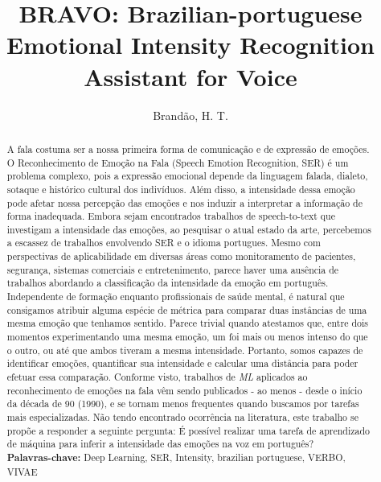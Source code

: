 \documentclass[12pt]{report}
\title{BRAVO: Brazilian-portuguese Emotional Intensity Recognition Assistant for Voice}
\author{Brandão, H. T.}
\begin{document}
\maketitle

\begin{abstract}
A fala costuma ser a nossa primeira forma de comunicação e de expressão de emoções. O Reconhecimento de Emoção na Fala (Speech Emotion Recognition, SER) é um problema complexo, pois a expressão emocional depende da linguagem falada, dialeto, sotaque e histórico cultural dos indivíduos. Além disso, a intensidade dessa emoção pode afetar nossa percepção das emoções e nos induzir a interpretar a informação de forma inadequada. Embora sejam encontrados trabalhos de speech-to-text que investigam a intensidade das emoções, ao pesquisar o atual estado da arte, percebemos a escassez de trabalhos envolvendo SER e o idioma portugues. Mesmo com perspectivas de aplicabilidade em diversas áreas como monitoramento de pacientes, segurança, sistemas comerciais e entretenimento, parece haver uma ausência de trabalhos abordando a classificação da intensidade da emoção em português. Independente de formação enquanto profissionais de saúde mental, é natural que consigamos atribuir alguma espécie de métrica para comparar duas instâncias de uma mesma emoção que tenhamos sentido. Parece trivial quando atestamos que, entre dois momentos experimentando uma mesma emoção, um foi mais ou menos intenso do que o outro, ou até que ambos tiveram a mesma intensidade. Portanto, somos capazes de identificar emoções, quantificar sua intensidade e calcular uma distância para poder efetuar essa comparação. Conforme visto, trabalhos de \textit{ML} aplicados ao reconhecimento de emoções na fala vêm sendo publicados - ao menos - desde o início da década de 90 (1990), e se tornam menos frequentes quando buscamos por tarefas mais especializadas. Não tendo encontrado ocorrência na literatura, este trabalho se propõe a responder a seguinte pergunta: É possível realizar uma tarefa de aprendizado de máquina para inferir a intensidade das emoções na voz em português?\\

\noindent \textbf{Palavras-chave:} Deep Learning, SER, Intensity, brazilian portuguese, VERBO, VIVAE
\end{abstract}
\clearpage
\end{document}
